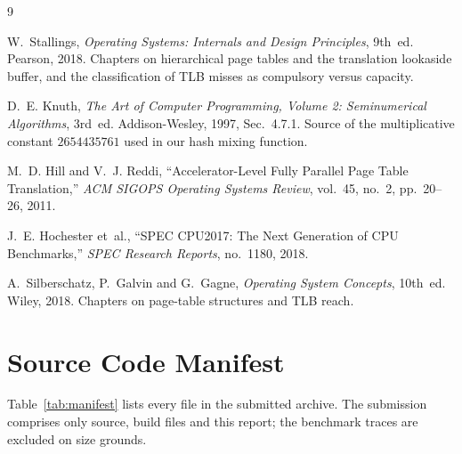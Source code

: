 \documentclass[11pt,a4paper]{article}
\begin{document}
\begin{thebibliography}{9}
W.~Stallings, \emph{Operating Systems: Internals and Design Principles}, 9th~ed.
Pearson, 2018. Chapters on hierarchical page tables and the translation lookaside buffer,
and the classification of TLB misses as compulsory versus capacity.

D.~E. Knuth, \emph{The Art of Computer Programming, Volume 2: Seminumerical Algorithms},
3rd~ed. Addison-Wesley, 1997, Sec.~4.7.1. Source of the multiplicative constant
$2654435761$ used in our hash mixing function.

M.~D. Hill and V.~J. Reddi, ``Accelerator-Level Fully Parallel Page Table Translation,''
\emph{ACM SIGOPS Operating Systems Review}, vol.~45, no.~2, pp.~20--26, 2011.

J.~E. Hochester et~al., ``SPEC CPU2017: The Next Generation of CPU Benchmarks,''
\emph{SPEC Research Reports}, no.~1180, 2018.

A.~Silberschatz, P.~Galvin and G.~Gagne, \emph{Operating System Concepts}, 10th~ed.
Wiley, 2018. Chapters on page-table structures and TLB reach.
\end{thebibliography}

\appendix
\section{Source Code Manifest}
Table~\ref{tab:manifest} lists every file in the submitted archive. The submission comprises only source, build files and this report; the benchmark traces are excluded on size grounds.
\end{document}
